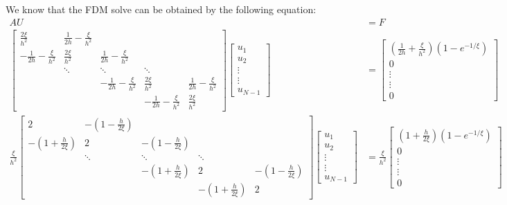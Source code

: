 \documentclass{article}
\begin{document}
We know that the FDM solve can be obtained by the following equation:
\begin{align*}
AU &= F\\
\begin{bmatrix}
\frac{2\xi}{h^2} & \frac{1}{2h}-\frac{\xi}{h^2} &  &  &  \\
-\frac{1}{2h}-\frac{\xi}{h^2} & \frac{2\xi}{h^2} & \frac{1}{2h}-\frac{\xi}{h^2} &  &  \\
 & \ddots & \ddots & \ddots &  \\
 &  & -\frac{1}{2h}-\frac{\xi}{h^2} & \frac{2\xi}{h^2} & \frac{1}{2h}-\frac{\xi}{h^2}\\
 &  &  & -\frac{1}{2h}-\frac{\xi}{h^2} & \frac{2\xi}{h^2}
\end{bmatrix}
\begin{bmatrix}
u_1\\
u_2\\
\vdots\\
\vdots\\
u_{N-1}
\end{bmatrix} &=
\begin{bmatrix}
(\frac{1}{2h}+\frac{\xi}{h^2})(1-e^{-1/\xi})\\
0\\
\vdots\\
\vdots\\
0
\end{bmatrix}\\
\frac{\xi}{h^2}\begin{bmatrix}
2 & -(1-\frac{h}{2\xi}) &  &  &  \\
-(1+\frac{h}{2\xi}) & 2 & -(1-\frac{h}{2\xi}) &  &  \\
 & \ddots & \ddots & \ddots &  \\
 &  & -(1+\frac{h}{2\xi}) & 2 & -(1-\frac{h}{2\xi})\\
 &  &  & -(1+\frac{h}{2\xi}) & 2
\end{bmatrix}
\begin{bmatrix}
u_1\\
u_2\\
\vdots\\
\vdots\\
u_{N-1}
\end{bmatrix} &=
\frac{\xi}{h^2}\begin{bmatrix}
(1+\frac{h}{2\xi})(1-e^{-1/\xi})\\
0\\
\vdots\\
\vdots\\
0
\end{bmatrix}\\

\end{align*}
\end{document}
